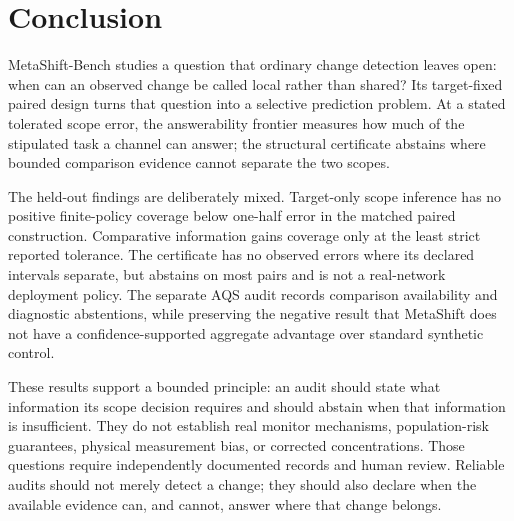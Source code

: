 \section{Conclusion}
\suppressfloats[t]

MetaShift-Bench studies a question that ordinary change detection leaves open:
when can an observed change be called local rather than shared? Its
target-fixed paired design turns that question into a selective prediction
problem. At a stated tolerated scope error, the answerability frontier measures
how much of the stipulated task a channel can answer; the structural
certificate abstains where bounded comparison evidence cannot separate the
two scopes.

The held-out findings are deliberately mixed. Target-only scope inference has
no positive finite-policy coverage below one-half error in the matched paired
construction. Comparative information gains coverage only at the least strict
reported tolerance. The certificate has no observed errors where its declared
intervals separate, but abstains on most pairs and is not a real-network
deployment policy. The separate AQS audit records comparison availability and
diagnostic abstentions, while preserving the negative result that MetaShift
does not have a confidence-supported aggregate advantage over standard
synthetic control.

These results support a bounded principle: an audit should state what
information its scope decision requires and should abstain when that
information is insufficient. They do not establish real monitor mechanisms,
population-risk guarantees, physical measurement bias, or corrected
concentrations. Those questions require independently documented records and
human review. Reliable audits should not merely detect a change; they should
also declare when the available evidence can, and cannot, answer where that
change belongs.
